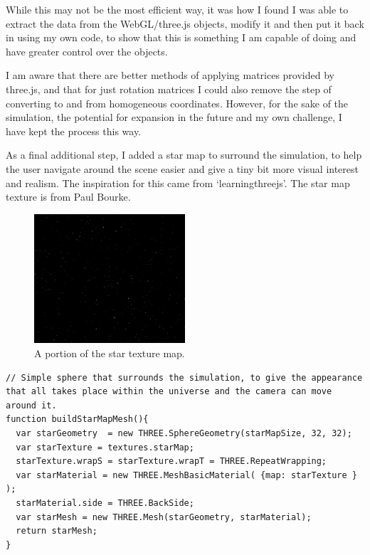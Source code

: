 \documentclass[12pt]{article}
\begin{document}
While this may not be the most efficient way, it was how I found I was able to extract the data from the WebGL/three.js objects, modify it and then put it back in using my own code, to show that this is something I am capable of doing and have greater control over the objects.

I am aware that there are better methods of applying matrices provided by three.js, and that for just rotation matrices I could also remove the step of converting to and from homogeneous coordinates. However, for the sake of the simulation, the potential for expansion in the future and my own challenge, I have kept the process this way.

As a final additional step, I added a star map to surround the simulation, to help the user navigate around the scene easier and give a tiny bit more visual interest and realism. The inspiration for this came from `learningthreejs'\cite{learningthreejs}. The star map texture is from Paul Bourke\cite{startexture}.

\begin{figure}[H]
        \centering
                \includegraphics[width=0.5\textwidth]{images/stars}
                \caption{A portion of the star texture map.}
                \label{fig: Star map.} 
\end{figure}

\begin{lstlisting}
// Simple sphere that surrounds the simulation, to give the appearance that all takes place within the universe and the camera can move around it.
function buildStarMapMesh(){
  var starGeometry  = new THREE.SphereGeometry(starMapSize, 32, 32);
  var starTexture = textures.starMap;
  starTexture.wrapS = starTexture.wrapT = THREE.RepeatWrapping; 
  var starMaterial = new THREE.MeshBasicMaterial( {map: starTexture } );
  starMaterial.side = THREE.BackSide;
  var starMesh = new THREE.Mesh(starGeometry, starMaterial);
  return starMesh;
}
\end{lstlisting}
\end{document}
